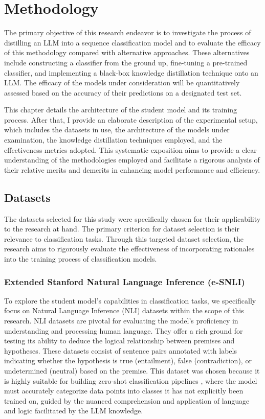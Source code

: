 \chapter{Methodology}
\label{chap:met}

The primary objective of this research endeavor is to investigate the process of distilling an LLM into a sequence classification model and to evaluate the efficacy of this methodology compared with alternative approaches. These alternatives include constructing a classifier from the ground up, fine-tuning a pre-trained classifier, and implementing a black-box knowledge distillation technique onto an LLM\@. The efficacy of the models under consideration will be quantitatively assessed based on the accuracy of their predictions on a designated test set.

This chapter details the architecture of the student model and its training process. After that, I provide an elaborate description of the experimental setup, which includes the datasets in use, the architecture of the models under examination, the knowledge distillation techniques employed, and the effectiveness metrics adopted. This systematic exposition aims to provide a clear understanding of the methodologies employed and facilitate a rigorous analysis of their relative merits and demerits in enhancing model performance and efficiency.

\section{Datasets}
\label{sec:datasets}

The datasets selected for this study were specifically chosen for their applicability to the research at hand. The primary criterion for dataset selection is their relevance to classification tasks. Through this targeted dataset selection, the research aims to rigorously evaluate the effectiveness of incorporating rationales into the training process of classification models.

\subsection{Extended Stanford Natural Language Inference (e-SNLI)}
\label{sec:esnli}

To explore the student model's capabilities in classification tasks, we specifically focus on Natural Language Inference (NLI) datasets within the scope of this research. NLI datasets are pivotal for evaluating the model's proficiency in understanding and processing human language. They offer a rich ground for testing its ability to deduce the logical relationship between premises and hypotheses. These datasets consist of sentence pairs annotated with labels indicating whether the hypothesis is true (entailment), false (contradiction), or undetermined (neutral) based on the premise. This dataset was chosen because it is highly suitable for building zero-shot classification pipelines \cite{zeroshotclf}, where the model must accurately categorize data points into classes it has not explicitly been trained on, guided by the nuanced comprehension and application of language and logic facilitated by the LLM knowledge.

